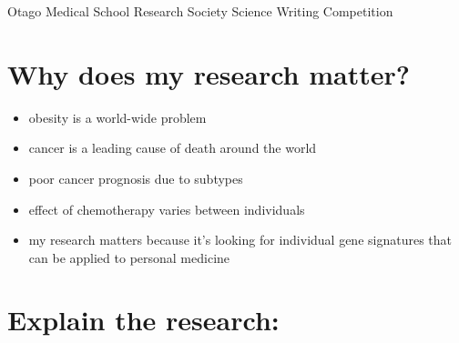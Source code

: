 \documentclass[a4paper, 11pt]{article}
\begin{document}
\begin{center}
\LARGE{Otago Medical School Research Society Science Writing Competition}\\
\end{center}

\section*{Why does my research matter?}
\noindent
\begin{itemize}
\item{obesity is a world-wide problem}
\item{cancer is a leading cause of death around the world}
\item{poor cancer prognosis due to subtypes}
\item{effect of chemotherapy varies between individuals}
\item{my research matters because it's looking for individual gene signatures that can be applied to personal medicine}
\end{itemize}

\section*{Explain the research:}
\noindent
\end{document}
